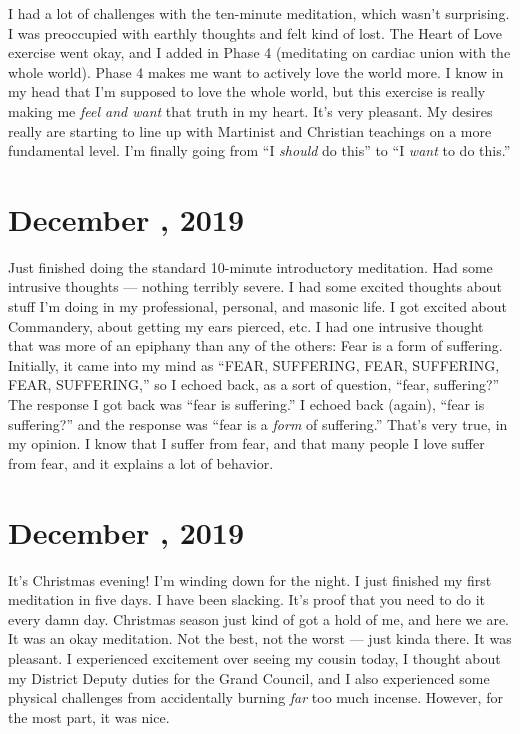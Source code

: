 \documentclass[b6paper]{article}
\begin{document}
I had a lot of challenges with the ten-minute meditation, which wasn't surprising. I was preoccupied with earthly thoughts and felt kind of lost. The Heart of Love exercise went okay, and I added in Phase 4 (meditating on cardiac union with the whole world). Phase 4 makes me want to actively love the world more. I know in my head that I'm supposed to love the whole world, but this exercise is really making me \textit{feel and want} that truth in my heart. It's very pleasant. My desires really are starting to line up with Martinist and Christian teachings on a more fundamental level. I'm finally going from ``I \textit{should} do this'' to ``I \textit{want} to do this.''

\pagebreak
\section*{December , 2019}

Just finished doing the standard 10-minute introductory meditation. Had some intrusive thoughts --- nothing terribly severe. I had some excited thoughts about stuff I'm doing in my professional, personal, and masonic life. I got excited about Commandery, about getting my ears pierced, etc. I had one intrusive thought that was more of an epiphany than any of the others: Fear is a form of suffering. Initially, it came into my mind as ``FEAR, SUFFERING, FEAR, SUFFERING, FEAR, SUFFERING,'' so I echoed back, as a sort of question, ``fear, suffering?'' The response I got back was ``fear is suffering.'' I echoed back (again), ``fear is suffering?'' and the response was ``fear is a \textit{form} of suffering.'' That's very true, in my opinion. I know that I suffer from fear, and that many people I love suffer from fear, and it explains a lot of behavior.

\pagebreak
\section*{December , 2019}

It's Christmas evening! I'm winding down for the night. I just finished my first meditation in five days. I have been slacking. It's proof that you need to do it every damn day. Christmas season just kind of got a hold of me, and here we are. It was an okay meditation. Not the best, not the worst --- just kinda there. It was pleasant. I experienced excitement over seeing my cousin today, I thought about my District Deputy duties for the Grand Council, and I also experienced some physical challenges from accidentally burning \textit{far} too much incense. However, for the most part, it was nice.
\end{document}
